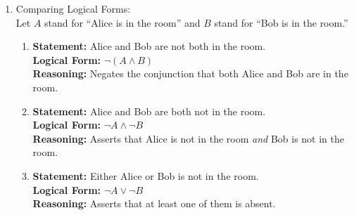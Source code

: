 \begin{enumerate}
\begin{enumerate}
  \item \textbf{Statement:} I'll have either fish or chicken, but I won't have both fish and mashed potatoes. \\
    \textbf{Atomic Statements:} Let $F$ denote ``I'll have fish,'' $C$ denote ``I'll have chicken,''  and $M$ denote ``I'll have mashed potatoes.'' \\
    \textbf{Logical Form:} $(F \lor C) \land \neg(F \land M)$ \\
    \textbf{Reasoning:} ``Either fish or chicken'' if $(F \lor C)$. ``But'' represents conjunction ($\land$). ``Not both fish and mashed potatoes'' represents $\neg(F \land M)$.

  \item \textbf{Statement:} 3 is a common divisor of 6, 9 and 15. \\
    \textbf{Atomic Statements:} Let $D_1$ denote ``3 is a divisor of 6,'' $D_2$ denote ``3 is a divisor of 9,'' and $D_3$ denote ``3 is a divisor of 15.'' \\
    \textbf{Logical Form:} $D_1 \land D_2 \land D_3$ \\
    \textbf{Reasoning:} Stating that 3 is a common divisor means 3 divides 6 \emph{and} 3 divides 9 \emph{and} 3 divides 15.
  \end{enumerate}

\item Comparing Logical Forms: \\
  Let $A$ stand for ``Alice is in the room'' and $B$ stand for ``Bob is in the room.''
  \begin{enumerate}
  \item \textbf{Statement:} Alice and Bob are not both in the room. \\
    \textbf{Logical Form:} $\neg(A \land B)$  \\
    \textbf{Reasoning:} Negates the conjunction that both Alice and Bob are in the room.

  \item \textbf{Statement:} Alice and Bob are both not in the room. \\
    \textbf{Logical Form:} $\neg A \land \neg B$ \\
    \textbf{Reasoning:} Asserts that Alice is not in the room \emph{and} Bob is not in the room.

  \item \textbf{Statement:} Either Alice or Bob is not in the room. \\
    \textbf{Logical Form:} $\neg A \lor \neg B$ \\
    \textbf{Reasoning:} Asserts that at least one of them is absent.


\end{enumerate}
\end{enumerate}
